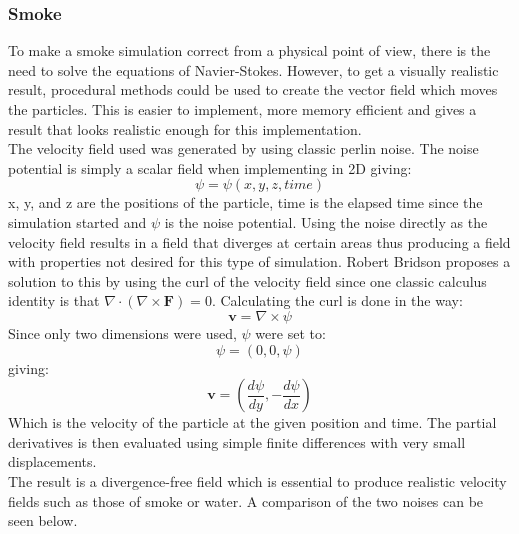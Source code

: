 \documentclass[report]{vgtc}
\begin{document}
	\subsubsection{Smoke}
To make a smoke simulation correct from a physical point of view, there is the need to solve the equations of Navier-Stokes. However, to get a visually realistic result, procedural methods could be used to create the vector field which moves the particles. This is easier to implement, more memory efficient and gives a result that looks realistic enough for this implementation.\\
The velocity field used was generated by using classic perlin noise\cite{stegu11}. The noise potential is simply a scalar field when implementing in 2D giving:
\begin{equation}
	\psi = \psi(x, y, z, time)
\end{equation}
x, y, and z are the positions of the particle, time is the elapsed time since the simulation started and \(\psi\) is the noise potential. Using the noise directly as the velocity field results in a field that diverges at certain areas thus producing a field with properties not desired for this type of simulation. Robert Bridson\cite{bridson07} proposes a solution to this by using the curl of the velocity field since one classic calculus identity is that \(\nabla \cdot (\nabla \times \mathbf{F}) = 0 \). Calculating the curl is done in the way:
\begin{equation}
	\mathbf{v} =  \nabla \times \psi
\end{equation}
Since only two dimensions were used, \(\psi\) were set to:
\begin{equation}
	\psi = (0, 0, \psi)
\end{equation}
giving:
\begin{equation}
	\mathbf{v} =(\frac{d\psi}{dy}, -\frac{d\psi}{dx})
\end{equation}
Which is the velocity of the particle at the given position and time.
The partial derivatives is then evaluated using simple finite differences with very small displacements. \\
The result is a divergence-free field which is essential to produce realistic velocity fields such  as those of smoke or water.  A comparison of the two noises can be seen below.
\end{document}
